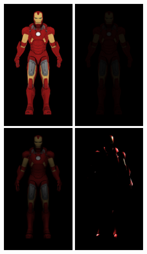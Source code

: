 \documentclass[a4paper,itemph,amsmath,oneside,11pt,openany]{xoblivoir}
\begin{document}
\begin{figure}[H]
\includegraphics[width=37mm]{img/albedo}
\includegraphics[width=37mm]{img/ambient}
\includegraphics[width=37mm]{img/diffuse}
\includegraphics[width=37mm]{img/specular_wet}

\end{figure}
\end{document}
